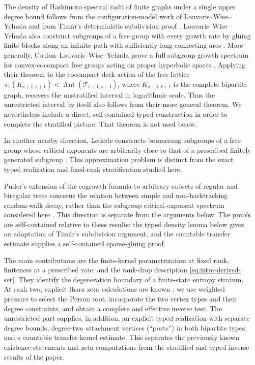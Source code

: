 \documentclass[11pt]{amsart}
\theoremstyle{plain}
\theoremstyle{definition}
\theoremstyle{remark}
\newcommand{\T}{\mathcal T}
\newcommand{\Aut}{\operatorname{Aut}}
\begin{document}
The density of Hashimoto spectral radii of finite graphs under a single upper
degree bound follows from the configuration-model work of
Louvaris--Wise--Yehuda and from Tim\'ar's deterministic subdivision proof
\cite{LouvarisWiseYehuda2026,Timar2026}.  Louvaris--Wise--Yehuda also
construct subgroups of a free group with every growth rate by gluing
finite blocks along an infinite path with sufficiently long connecting arcs
\cite{LouvarisWiseYehuda2025EveryRate}.  More generally,
Coulon--Louvaris--Wise--Yehuda prove a full subgroup growth spectrum for
convex-cocompact free groups acting on proper hyperbolic spaces
\cite{CLWY2026}.  Applying their theorem to the cocompact deck action of
the free lattice
\(\pi_1(K_{s+1,r+1})<\Aut(\T_{r+1,s+1})\), where
\(K_{s+1,r+1}\) is the complete bipartite graph, recovers the unstratified
interval in logarithmic scale.  Thus the unrestricted interval by itself also
follows from their more general theorem.  We nevertheless include a direct,
self-contained typed construction in order to complete the stratified picture.
That theorem is not used below.

In another nearby direction, Lederle constructs boomerang subgroups of
a free group whose critical exponents are arbitrarily close to that of a
prescribed finitely generated subgroup \cite{Lederle2025}.  This approximation
problem is distinct from the exact typed realization and fixed-rank
stratification studied here.

Puder's extension of the cogrowth formula to arbitrary subsets of
regular and biregular trees concerns the relation between simple and
non-backtracking random-walk decay, rather than the subgroup
critical-exponent spectrum considered here \cite{Puder2024}.  This direction
is separate from the arguments below.  The proofs are self-contained relative
to these results: the typed density lemma below gives an adaptation of Tim\'ar's
subdivision argument, and the countable transfer estimate supplies a
self-contained sparse-gluing proof.

The main contributions are the finite-kernel
parametrization at fixed rank, finiteness at a prescribed rate, and the
rank-drop description \eqref{eq:intro-derived-set}.  They identify the
degeneration boundary of a finite-state entropy stratum.  At rank two,
explicit Ihara zeta calculations
are known \cite{KwonLee2020,ChicoMattmanRichards2025}; we use weighted
pressure to select the Perron root, incorporate the two vertex types and
their degree constraints, and obtain a complete and effective inverse test.
The unrestricted part supplies, in addition, an explicit typed realization
with separate degree bounds, degree-two attachment vertices (``ports'') in
both bipartite types, and a countable transfer-kernel estimate.  This
separates the previously known existence statements and zeta computations
from the stratified and typed inverse results of the paper.
\end{document}
